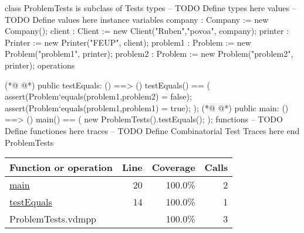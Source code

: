 \begin{vdmpp}[breaklines=true]
class ProblemTests is subclass of Tests
types
-- TODO Define types here
values
-- TODO Define values here
instance variables
company : Company := new Company();
client : Client := new Client("Ruben","povoa", company);
printer : Printer := new Printer("FEUP", client);
problem1 : Problem := new Problem("problem1", printer);
problem2 : Problem := new Problem("problem2", printer);
operations

(*@
\label{testEquals:14}
@*)
public testEquals: () ==> ()
testEquals() ==
(
assert(Problem`equals(problem1,problem2) = false);
assert(Problem`equals(problem1,problem1) = true);
);
(*@
\label{main:20}
@*)
public  main: () ==> ()
main() ==
(
new ProblemTests().testEquals();
);
functions
-- TODO Define functiones here
traces
-- TODO Define Combinatorial Test Traces here
end ProblemTests
\end{vdmpp}
\bigskip
\begin{longtable}{|l|r|r|r|}
\hline
Function or operation & Line & Coverage & Calls \\
\hline
\hline
\hyperref[main:20]{main} & 20&100.0\% & 2 \\
\hline
\hyperref[testEquals:14]{testEquals} & 14&100.0\% & 1 \\
\hline
\hline
ProblemTests.vdmpp & & 100.0\% & 3 \\
\hline
\end{longtable}

